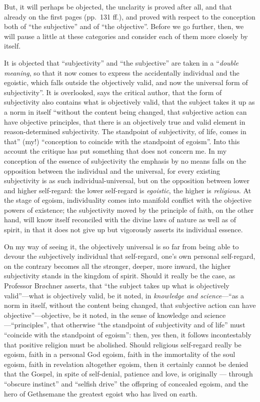 \documentclass[12pt]{book}
\newcommand{\opage}[1]{\marginnote{\footnotesize\textit{[#1]}}}
\begin{document}
But, it will perhaps be objected, the unclarity is proved after all, and
that already on the first pages (pp.\ 131 ff.), and proved with respect to
the conception both of ``the subjective'' and of ``the objective''. Before
we go further, then, we will pause a little at these categories and consider
each of them more closely by itself.

It is objected that ``subjectivity'' and ``the subjective'' are taken in a
``\emph{double meaning}, so that it now comes to express the accidentally
individual and the egoistic, which falls outside the objectively valid, and
now the universal form of subjectivity''. It is overlooked, says the critical
author, that the form of subjectivity also contains what is objectively
valid, that the subject takes it up as a norm in itself ``without the content
being changed, that subjective action can have objective principles, that
there is an objectively true and valid element in reason-determined
subjectivity. The standpoint of subjectivity, of life, comes in that'' (my!)
``conception to coincide with the standpoint of egoism''. Into this account
the critique has put something that does not concern me. In my conception of
the essence of subjectivity the emphasis by no means falls on the opposition
between the individual and the universal, for every existing subjectivity is
as such individual-universal, but on the opposition between lower and higher
self-regard: the lower self-regard is \emph{egoistic}, the higher is
\emph{religious}. At the stage of egoism, individuality comes into manifold
conflict with the objective powers of existence; the subjectivity moved by
the principle of faith, on the other hand, will know itself reconciled with
the divine laws of nature as well as of spirit, in that it does not give up
but vigorously asserts its individual essence.

\opage{11}\setcounter{footnote}{0}%
On my way of seeing it, the objectively universal is so far from being able
to devour the subjectively individual that self-regard, one's own personal
self-regard, on the contrary becomes all the stronger, deeper, more inward,
the higher subjectivity stands in the kingdom of spirit. Should it really be
the case, as Professor Brøchner asserts, that ``the subject takes up what
is objectively valid''---what is objectively valid, be it noted, in
\emph{knowledge and science}---``as a norm in itself, without the content
being changed, that subjective action can have objective''---objective, be
it noted, in the sense of knowledge and science---``principles'', that
otherwise ``the standpoint of subjectivity and of life'' must ``coincide
with the standpoint of egoism'': then, yes then, it follows incontestably
that positive religion must be abolished. Should religious self-regard
really be egoism, faith in a personal God egoism, faith in the immortality
of the soul egoism, faith in revelation altogether egoism, then it certainly
cannot be denied that the Gospel, in spite of self-denial, patience and
love, is originally --- through ``obscure instinct'' and ``selfish drive''
the offspring of concealed egoism, and the hero of Gethsemane the greatest
egoist who has lived on earth.
\end{document}
